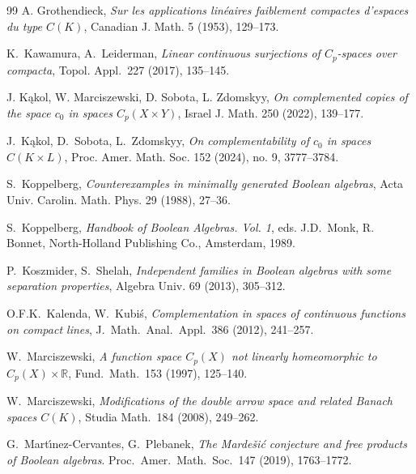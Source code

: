 \documentclass[12pt,fleqn]{amsart}
\numberwithin{equation}{section}
\theoremstyle{definition}
\begin{document}
\begin{thebibliography}{99}
A. Grothendieck, {\em Sur les applications lin\'eaires faiblement compactes d'espaces du type $C(K)$}, Canadian J. Math. 5 (1953), 129--173.

K.\ Kawamura, A.\  Leiderman, 
{\em Linear continuous surjections of $C_p$-spaces over compacta},
Topol. Appl.\ 227 (2017), 135--145. 

J. K\k{a}kol, W. Marciszewski, D. Sobota, L. Zdomskyy, {\em On complemented copies of the space $c_0$ in spaces $C_p(X\times Y)$}, Israel J. Math. 250 (2022), 139--177.

J.\ K\k{a}kol, D.\ Sobota, L.\ Zdomskyy, {\em On complementability of $c_0$ in spaces $C(K\times L)$}, 
Proc. Amer. Math. Soc. 152 (2024), no. 9, 3777--3784.

S.\ Koppelberg, {\em Counterexamples in minimally generated Boolean algebras},
Acta Univ. Carolin. Math. Phys. 29 (1988),  27--36.
 
 S.\ Koppelberg, {\em Handbook of Boolean Algebras. Vol. 1}, 
 eds. J.D.\ Monk, R. Bonnet, North-Holland Publishing Co., Amsterdam, 1989.
 
P.\ Koszmider, S.\  Shelah, {\em 
Independent families in Boolean algebras with some separation properties},
Algebra Univ. 69 (2013), 305--312. 
 
 O.F.K.\  Kalenda, W.\  Kubi\'s, {\em  Complementation in spaces of continuous 
 functions on compact lines},  J.\ Math.\ Anal.\ Appl.\ 386 (2012),  241--257.  
 
 W.\  Marciszewski, {\em A function space $C_p(X)$ not linearly homeomorphic to 
 $C_p(X)\times {\mathbb R}$},  Fund.\ Math.\ 153 (1997),  125--140. 
 
W.\  Marciszewski, {\em Modifications of the double arrow space and related Banach spaces $C(K)$},
 Studia Math.\ 184 (2008),  249--262. 

G.\ Mart\'{\i}nez-Cervantes, G.\  Plebanek, {\em 
The Marde\v{s}i\'c conjecture and free products of Boolean algebras}. 
Proc.\ Amer.\ Math.\ Soc.\ 147 (2019),  1763--1772.



\end{thebibliography}
\end{document}
